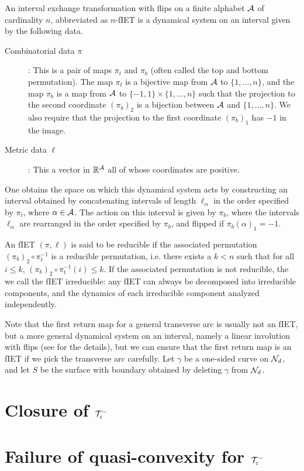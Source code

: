 \documentclass[12pt, reqno]{amsart}
\begin{document}
An interval exchange transformation with flips on a finite alphabet $\mathcal{A}$ of cardinality $n$, abbreviated as $n$-fIET is a dynamical system on an interval given by the following data.
\begin{description}
\item[Combinatorial data $\pi$]: This is a pair of maps $\pi_t$ and $\pi_b$ (often called the top and bottom permutation).
  The map $\pi_t$ is a bijective map from $\mathcal{A}$ to $\{ 1, \ldots, n\}$, and the map $\pi_b$ is a map from $\mathcal{A}$ to $\{-1, 1\} \times \{1, \ldots, n\}$ such that the projection to the second coordinate $(\pi_b)_2$ is a bijection between $\mathcal{A}$ and $\{1, \ldots, n\}$.
We also require that the projection to the first coordinate $(\pi_b)_1$ has $-1$ in the image.
\item[Metric data $\ell$]: This a vector in $\mathbb{R}^{\mathcal{A}}$ all of whose coordinates are positive.
\end{description}
One obtains the space on which this dynamical system acts by constructing an interval obtained by concatenating intervals of length $\ell_{\alpha}$ in the order specified by $\pi_t$, where $\alpha \in \mathcal{A}$.
The action on this interval is given by $\pi_b$, where the intervals $\ell_{\alpha}$ are rearranged in the order specified by $\pi_b$, and flipped if $\pi_b(\alpha)_1 = -1$.

An fIET $(\pi, \ell)$ is said to be reducible if the associated permutation $(\pi_b)_2 \circ \pi_t^{-1}$ is a reducible permutation, i.e. there exists a $k < n$ such that for all $i \leq k$, $(\pi_b)_2 \circ \pi_t^{-1}(i) \leq k$.
If the associated permutation is not reducible, the we call the fIET irreducible: any fIET can always be decomposed into irreducible components, and the dynamics of each irreducible component analyzed independently.

Note that the first return map for a general transverse arc is usually not an fIET, but a more general dynamical system on an interval, namely a linear involution with flips (see \cite{ASENS_1990_4_23_3_469_0} for the details), but we can ensure that the first return map is an fIET if we pick the transverse arc carefully.
Let $\gamma$ be a one-sided curve on $\mathcal{N}_d$, and let $S$ be the surface with boundary obtained by deleting $\gamma$ from $\mathcal{N}_d$.

\section{Closure of $\mathcal{T}_{\varepsilon}^{-}$}
\label{sec:closure-systole}

\section{Failure of quasi-convexity for $\mathcal{T}_{\varepsilon}^{-}$}
\label{sec:fail-quasi-conv}



\printbibliography
\end{document}
